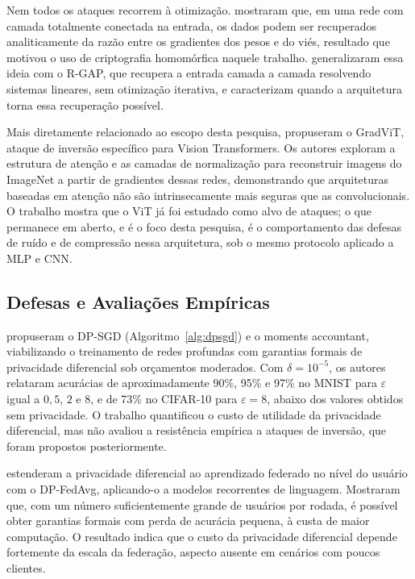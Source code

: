 Nem todos os ataques recorrem à otimização.  mostraram que, em uma rede com camada totalmente conectada na entrada, os dados podem ser recuperados analiticamente da razão entre os gradientes dos pesos e do viés, resultado que motivou o uso de criptografia homomórfica naquele trabalho.  generalizaram essa ideia com o R-GAP, que recupera a entrada camada a camada resolvendo sistemas lineares, sem otimização iterativa, e caracterizam quando a arquitetura torna essa recuperação possível.

Mais diretamente relacionado ao escopo desta pesquisa,  propuseram o GradViT, ataque de inversão específico para Vision Transformers. Os autores exploram a estrutura de atenção e as camadas de normalização para reconstruir imagens do ImageNet a partir de gradientes dessas redes, demonstrando que arquiteturas baseadas em atenção não são intrinsecamente mais seguras que as convolucionais. O trabalho mostra que o ViT já foi estudado como alvo de ataques; o que permanece em aberto, e é o foco desta pesquisa, é o comportamento das defesas de ruído e de compressão nessa arquitetura, sob o mesmo protocolo aplicado a MLP e CNN.

\subsection{Defesas e Avaliações Empíricas}

 propuseram o DP-SGD (Algoritmo~\ref{alg:dpsgd}) e o moments accountant, viabilizando o treinamento de redes profundas com garantias formais de privacidade diferencial sob orçamentos moderados. Com $\delta = 10^{-5}$, os autores relataram acurácias de aproximadamente 90\%, 95\% e 97\% no MNIST para $\varepsilon$ igual a $0{,}5$, $2$ e $8$, e de 73\% no CIFAR-10 para $\varepsilon = 8$, abaixo dos valores obtidos sem privacidade. O trabalho quantificou o custo de utilidade da privacidade diferencial, mas não avaliou a resistência empírica a ataques de inversão, que foram propostos posteriormente.

 estenderam a privacidade diferencial ao aprendizado federado no nível do usuário com o DP-FedAvg, aplicando-o a modelos recorrentes de linguagem. Mostraram que, com um número suficientemente grande de usuários por rodada, é possível obter garantias formais com perda de acurácia pequena, à custa de maior computação. O resultado indica que o custo da privacidade diferencial depende fortemente da escala da federação, aspecto ausente em cenários com poucos clientes.

